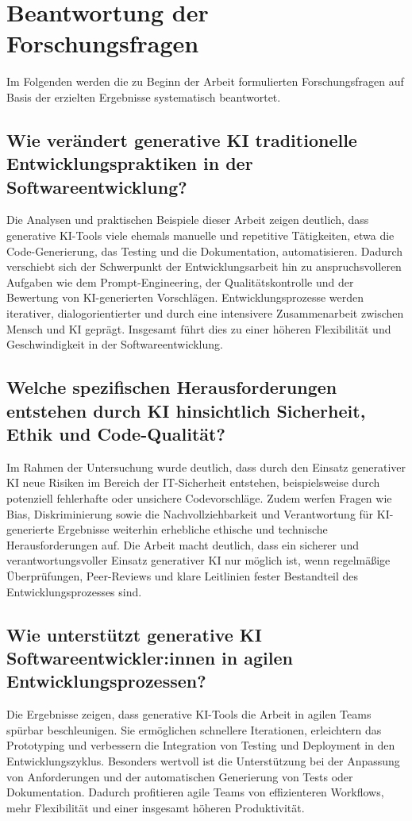 \section{Beantwortung der Forschungsfragen}

Im Folgenden werden die zu Beginn der Arbeit formulierten Forschungsfragen auf
Basis der erzielten Ergebnisse systematisch beantwortet.

\subsection*{Wie verändert generative KI traditionelle Entwicklungspraktiken in der Softwareentwicklung?}
Die Analysen und praktischen Beispiele dieser Arbeit zeigen deutlich, dass
generative KI-Tools viele ehemals manuelle und repetitive Tätigkeiten, etwa die
Code-Generierung, das Testing und die Dokumentation, automatisieren. Dadurch
verschiebt sich der Schwerpunkt der Entwicklungsarbeit hin zu anspruchsvolleren
Aufgaben wie dem Prompt-Engineering, der Qualitätskontrolle und der Bewertung
von KI-generierten Vorschlägen. Entwicklungsprozesse werden iterativer,
dialogorientierter und durch eine intensivere Zusammenarbeit zwischen Mensch
und KI geprägt. Insgesamt führt dies zu einer höheren Flexibilität und
Geschwindigkeit in der Softwareentwicklung.

\subsection*{Welche spezifischen Herausforderungen entstehen durch KI hinsichtlich Sicherheit, Ethik und Code-Qualität?}
Im Rahmen der Untersuchung wurde deutlich, dass durch den Einsatz generativer
KI neue Risiken im Bereich der IT-Sicherheit entstehen, beispielsweise durch
potenziell fehlerhafte oder unsichere Codevorschläge. Zudem werfen Fragen wie
Bias, Diskriminierung sowie die Nachvollziehbarkeit und Verantwortung für
KI-generierte Ergebnisse weiterhin erhebliche ethische und technische
Herausforderungen auf. Die Arbeit macht deutlich, dass ein sicherer und
verantwortungsvoller Einsatz generativer KI nur möglich ist, wenn regelmäßige
Überprüfungen, Peer-Reviews und klare Leitlinien fester Bestandteil des
Entwicklungsprozesses sind.

\subsection*{Wie unterstützt generative KI Softwareentwickler:innen in agilen Entwicklungsprozessen?}
Die Ergebnisse zeigen, dass generative KI-Tools die Arbeit in agilen Teams
spürbar beschleunigen. Sie ermöglichen schnellere Iterationen, erleichtern das
Prototyping und verbessern die Integration von Testing und Deployment in den
Entwicklungszyklus. Besonders wertvoll ist die Unterstützung bei der Anpassung
von Anforderungen und der automatischen Generierung von Tests oder
Dokumentation. Dadurch profitieren agile Teams von effizienteren Workflows,
mehr Flexibilität und einer insgesamt höheren Produktivität.

